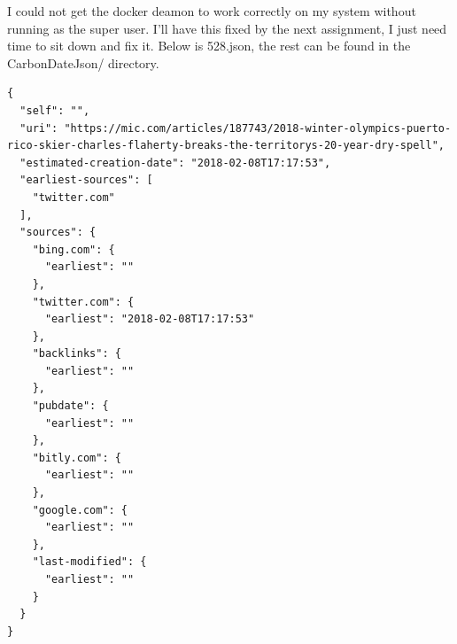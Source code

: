 \documentclass{article}
\begin{document}
I could not get the docker deamon to work correctly on my system without running as the super user. I'll have this fixed by the next assignment, I just need time to sit down and fix it. Below is 528.json, the rest can be found in the CarbonDateJson/ directory.
\begin{lstlisting}
{
  "self": "",
  "uri": "https://mic.com/articles/187743/2018-winter-olympics-puerto-rico-skier-charles-flaherty-breaks-the-territorys-20-year-dry-spell",
  "estimated-creation-date": "2018-02-08T17:17:53",
  "earliest-sources": [
    "twitter.com"
  ],
  "sources": {
    "bing.com": {
      "earliest": ""
    },
    "twitter.com": {
      "earliest": "2018-02-08T17:17:53"
    },
    "backlinks": {
      "earliest": ""
    },
    "pubdate": {
      "earliest": ""
    },
    "bitly.com": {
      "earliest": ""
    },
    "google.com": {
      "earliest": ""
    },
    "last-modified": {
      "earliest": ""
    }
  }
}
\end{lstlisting}
\end{document}
